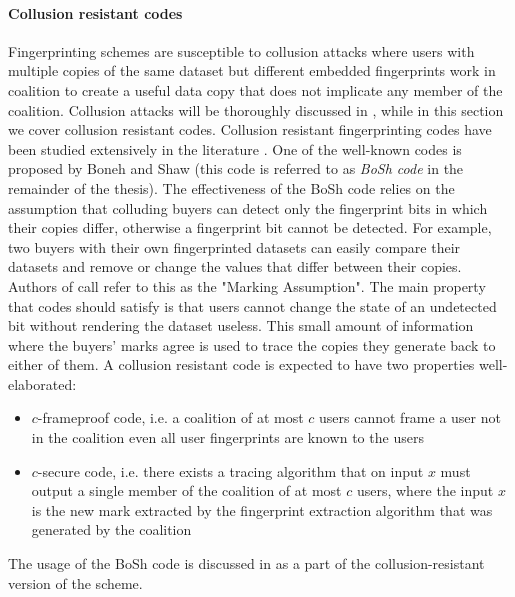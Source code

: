 \paragraph{Collusion resistant codes}
Fingerprinting schemes are susceptible to collusion attacks where users with multiple copies of the same dataset but different embedded fingerprints work in coalition to create a useful data copy that does not implicate any member of the coalition. 
Collusion attacks will be thoroughly discussed in , while in this section we cover collusion resistant codes.
Collusion resistant fingerprinting codes have been studied extensively in the literature \cite{boneh1998collusion, guth1999error, pfitzmann1999coin, pfitzmann1996asymmetric, yacobi2001improved}. 
One of the well-known codes is proposed by Boneh and Shaw \cite{boneh1998collusion} (this code is referred to as \textit{BoSh code} in the remainder of the thesis). 
The effectiveness of the BoSh code relies on the assumption that colluding buyers can detect only the fingerprint bits in which their copies differ, otherwise a fingerprint bit cannot be detected.
For example, two buyers with their own fingerprinted datasets can easily compare their datasets and remove or change the values that differ between their copies. 
Authors of \cite{boneh1998collusion} call refer to this as the "Marking Assumption". 
The main property that codes should satisfy is that users cannot change the state of an undetected bit without rendering the dataset useless. 
This small amount of information where the buyers' marks agree is used to trace the copies they generate back to either of them.
A collusion resistant code is expected to have two properties well-elaborated:
\begin{itemize}
    \item $c$-frameproof code, i.e. a coalition of at most $c$ users cannot frame a user not in the coalition even all user fingerprints are known to the users
    \item $c$-secure code, i.e. there exists a tracing algorithm that on input $x$ must output a single member of the coalition of at most $c$ users, where the input $x$ is the new mark extracted by the fingerprint extraction algorithm that was generated by the coalition
\end{itemize}
The usage of the BoSh code is discussed in  as a part of the collusion-resistant version of the scheme. 










